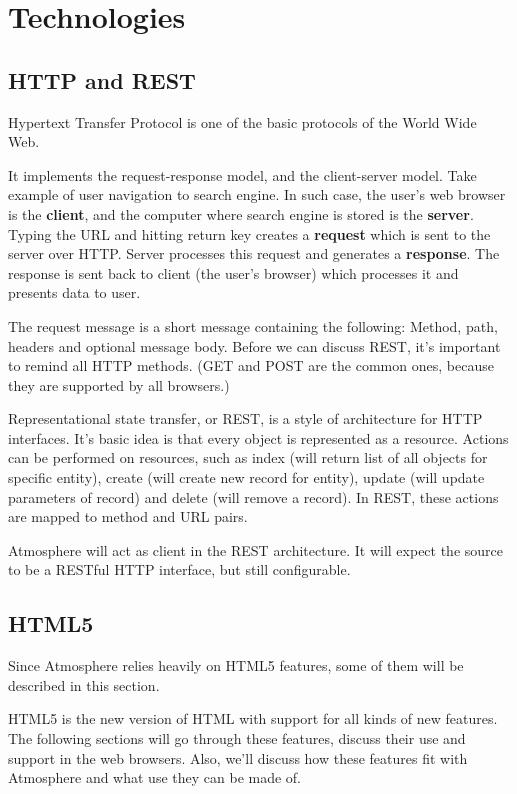 \section{Technologies}

\subsection{HTTP and REST}

Hypertext Transfer Protocol is one of the basic protocols of the World Wide Web.

It implements the request-response model, and the client-server model. Take example of user navigation to search engine. In such case, the user's web browser is the \textbf{client}, and the computer where search engine is stored is the \textbf{server}. Typing the URL and hitting return key creates a \textbf{request} which is sent to the server over HTTP. Server processes this request and generates a \textbf{response}. The response is sent back to client (the user's browser) which processes it and presents data to user.

The request message is a short message containing the following: Method, path, headers and optional message body. Before we can discuss REST, it’s important to remind all HTTP methods. (GET and POST are the common ones, because they are supported by all browsers.)

Representational state transfer, or REST, is a style of architecture for HTTP interfaces. It's basic idea is that every object is represented as a resource. Actions can be performed on resources, such as index (will return list of all objects for specific entity), create (will create new record for entity), update (will update parameters of record) and delete (will remove a record). In REST, these actions are mapped to method and URL pairs. \citep{rails_way}

Atmosphere will act as client in the REST architecture. It will expect the source to be a RESTful HTTP interface, but still configurable. 

\subsection{HTML5}

Since Atmosphere relies heavily on HTML5 features, some of them will be described in this section. 

HTML5 is the new version of HTML with support for all kinds of new features. The following sections will go through these features, discuss their use and support in the web browsers. Also, we’ll discuss how these features fit with Atmosphere and what use they can be made of.

